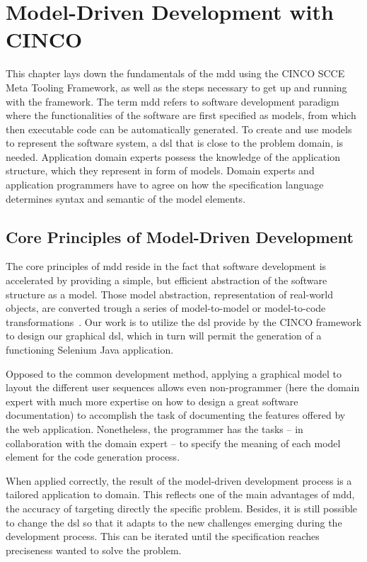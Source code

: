 
\chapter{Model-Driven Development with CINCO}\label{ch:Basis}

This chapter lays down the fundamentals of the \acrfull{mdd} using the CINCO SCCE Meta Tooling Framework, as well as the steps necessary to get up and running with the framework.
The term \acrshort{mdd} refers to software development paradigm where the functionalities of the software are first specified as models, from which then executable code can be automatically generated. To create and use models to represent the software system, a \acrfull{dsl} that is close to the problem domain, is needed. Application domain experts possess the knowledge of the application structure, which they represent in form of models. Domain experts and application programmers have to agree on how the specification language determines syntax and semantic of the model elements.

\section{Core Principles of Model-Driven Development}

The core principles of \acrfull{mdd} reside in the fact that software development is accelerated by providing a simple, but efficient abstraction of the software structure as a model. Those model abstraction, representation of real-world objects, are converted trough a series of model-to-model or model-to-code transformations~\cite{stahl_et_al}. Our work is to utilize the \acrshort{dsl} provide by the CINCO framework to design our graphical \acrshort{dsl}, which in turn will permit the generation of a functioning \gls{Selenium} Java application.

Opposed to the common development method, applying a graphical model to layout the different user sequences allows even non-programmer (here the domain expert with much more expertise on how to design a great software documentation) to accomplish the task of documenting the features offered by the web application. Nonetheless, the programmer has the tasks -- in collaboration with the domain expert -- to specify the meaning of each model element for the code generation process.

When applied correctly, the result of the model-driven development process is a tailored application to domain. This reflects one of the main advantages of \acrshort{mdd}, the accuracy of targeting directly the specific problem. Besides, it is still possible to change the \acrshort{dsl} so that it adapts to the new challenges emerging during the development process. This can be iterated until the specification reaches preciseness wanted to solve the problem.

